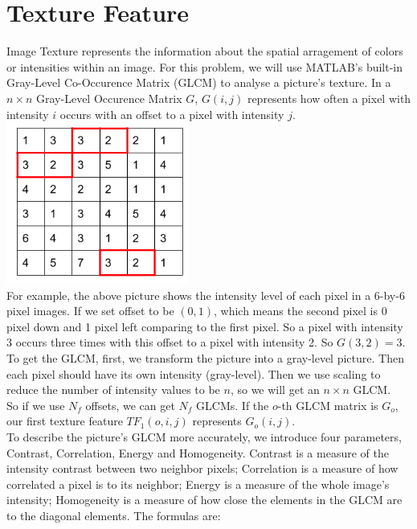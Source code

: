 \documentclass[12pt]{article}
\begin{document}
\section{Texture Feature}
Image Texture represents the information about the spatial arragement of colors or intensities within an image. For this problem, we will use MATLAB's built-in Gray-Level Co-Occurence Matrix (GLCM) to analyse a picture's texture. In a $n \times n$ Gray-Level Occurence Matrix $G$, $G(i, j)$ represents how often a pixel with intensity $i$ occurs with an offset to a pixel with intensity $j$. \\
\includegraphics[width = 6cm]{glcm} \\
For example, the above picture shows the intensity level of each pixel in a 6-by-6 pixel images. If we set offset to be $(0,1)$, which means the second pixel is 0 pixel down and 1 pixel left comparing to the first pixel. So a pixel with intensity 3 occurs three times with this offset to a pixel with intensity 2. So $G(3,2) = 3$.\\
To get the GLCM, first, we transform the picture into a gray-level picture. Then each pixel should have its own intensity (gray-level). Then we use scaling to reduce the number of intensity values to be $n$, so we will get an $n \times n$ GLCM. \\
So if we use $N_f$ offsets, we can get $N_f$ GLCMs. If the $o$-th GLCM matrix is $G_o$, our first texture feature $TF_1(o,i,j)$ represents $G_o(i, j)$. \\
To describe the picture's GLCM more accurately, we introduce four parameters, Contrast, Correlation, Energy and Homogeneity. Contrast is a measure of the intensity contrast between two neighbor pixels; Correlation is a measure of how correlated a pixel is to its neighbor; Energy is a measure of the whole image's intensity; Homogeneity is a measure of how close the elements in the GLCM are to the diagonal elements. The formulas are: \\
\end{document}
